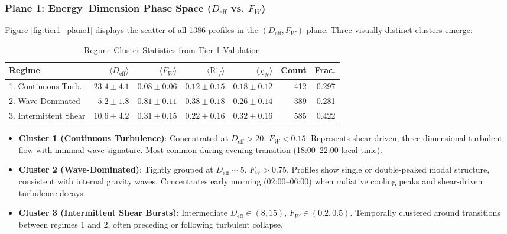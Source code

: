 \documentclass[11pt,a4paper]{article}
\begin{document}
\subsubsection{Plane 1: Energy--Dimension Phase Space ($D_{\mathrm{eff}}$ vs. $F_W$)}

Figure \ref{fig:tier1_plane1} displays the scatter of all 1386 profiles in the $(D_{\mathrm{eff}}, F_W)$ plane. Three visually distinct clusters emerge:

\begin{table}[h]
\centering
\caption{Regime Cluster Statistics from Tier 1 Validation}
\label{tab:regime_stats}
\begin{tabular}{l|rrrr|rr}
\hline
Regime & $\langle D_{\mathrm{eff}} \rangle$ & $\langle F_W \rangle$ & $\langle \mathrm{Ri}_f \rangle$ & $\langle \chi_N \rangle$ & Count & Frac. \\
\hline
1. Continuous Turb. & $23.4 \pm 4.1$ & $0.08 \pm 0.06$ & $0.12 \pm 0.15$ & $0.18 \pm 0.12$ & 412 & 0.297 \\
2. Wave-Dominated & $5.2 \pm 1.8$ & $0.81 \pm 0.11$ & $0.38 \pm 0.18$ & $0.26 \pm 0.14$ & 389 & 0.281 \\
3. Intermittent Shear & $10.6 \pm 4.2$ & $0.31 \pm 0.15$ & $0.22 \pm 0.16$ & $0.32 \pm 0.16$ & 585 & 0.422 \\
\hline
\end{tabular}
\end{table}

\begin{itemize}
  \item \textbf{Cluster 1 (Continuous Turbulence)}: Concentrated at $D_{\mathrm{eff}} > 20$, $F_W < 0.15$. Represents shear-driven, three-dimensional turbulent flow with minimal wave signature. Most common during evening transition (18:00--22:00 local time).

  \item \textbf{Cluster 2 (Wave-Dominated)}: Tightly grouped at $D_{\mathrm{eff}} \sim 5$, $F_W > 0.75$. Profiles show single or double-peaked modal structure, consistent with internal gravity waves. Concentrates early morning (02:00--06:00) when radiative cooling peaks and shear-driven turbulence decays.

  \item \textbf{Cluster 3 (Intermittent Shear Bursts)}: Intermediate $D_{\mathrm{eff}} \in (8, 15)$, $F_W \in (0.2, 0.5)$. Temporally clustered around transitions between regimes 1 and 2, often preceding or following turbulent collapse.
\end{itemize}
\end{document}
